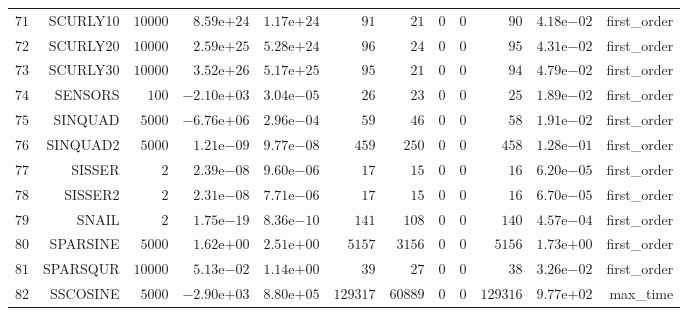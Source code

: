 \begin{longtable}{rrrrrrrrrrrr}
  \(    71\) & SCURLY10 & \( 10000\) & \( 8.59\)e\(+24\) & \( 1.17\)e\(+24\) & \(    91\) & \(    21\) & \(     0\) & \(     0\) & \(    90\) & \( 4.18\)e\(-02\) & first\_order \\
  \(    72\) & SCURLY20 & \( 10000\) & \( 2.59\)e\(+25\) & \( 5.28\)e\(+24\) & \(    96\) & \(    24\) & \(     0\) & \(     0\) & \(    95\) & \( 4.31\)e\(-02\) & first\_order \\
  \(    73\) & SCURLY30 & \( 10000\) & \( 3.52\)e\(+26\) & \( 5.17\)e\(+25\) & \(    95\) & \(    21\) & \(     0\) & \(     0\) & \(    94\) & \( 4.79\)e\(-02\) & first\_order \\
  \(    74\) & SENSORS & \(   100\) & \(-2.10\)e\(+03\) & \( 3.04\)e\(-05\) & \(    26\) & \(    23\) & \(     0\) & \(     0\) & \(    25\) & \( 1.89\)e\(-02\) & first\_order \\
  \(    75\) & SINQUAD & \(  5000\) & \(-6.76\)e\(+06\) & \( 2.96\)e\(-04\) & \(    59\) & \(    46\) & \(     0\) & \(     0\) & \(    58\) & \( 1.91\)e\(-02\) & first\_order \\
  \(    76\) & SINQUAD2 & \(  5000\) & \( 1.21\)e\(-09\) & \( 9.77\)e\(-08\) & \(   459\) & \(   250\) & \(     0\) & \(     0\) & \(   458\) & \( 1.28\)e\(-01\) & first\_order \\
  \(    77\) & SISSER & \(     2\) & \( 2.39\)e\(-08\) & \( 9.60\)e\(-06\) & \(    17\) & \(    15\) & \(     0\) & \(     0\) & \(    16\) & \( 6.20\)e\(-05\) & first\_order \\
  \(    78\) & SISSER2 & \(     2\) & \( 2.31\)e\(-08\) & \( 7.71\)e\(-06\) & \(    17\) & \(    15\) & \(     0\) & \(     0\) & \(    16\) & \( 6.70\)e\(-05\) & first\_order \\
  \(    79\) & SNAIL & \(     2\) & \( 1.75\)e\(-19\) & \( 8.36\)e\(-10\) & \(   141\) & \(   108\) & \(     0\) & \(     0\) & \(   140\) & \( 4.57\)e\(-04\) & first\_order \\
  \(    80\) & SPARSINE & \(  5000\) & \( 1.62\)e\(+00\) & \( 2.51\)e\(+00\) & \(  5157\) & \(  3156\) & \(     0\) & \(     0\) & \(  5156\) & \( 1.73\)e\(+00\) & first\_order \\
  \(    81\) & SPARSQUR & \( 10000\) & \( 5.13\)e\(-02\) & \( 1.14\)e\(+00\) & \(    39\) & \(    27\) & \(     0\) & \(     0\) & \(    38\) & \( 3.26\)e\(-02\) & first\_order \\
  \(    82\) & SSCOSINE & \(  5000\) & \(-2.90\)e\(+03\) & \( 8.80\)e\(+05\) & \(129317\) & \( 60889\) & \(     0\) & \(     0\) & \(129316\) & \( 9.77\)e\(+02\) & max\_time \\

\end{longtable}
